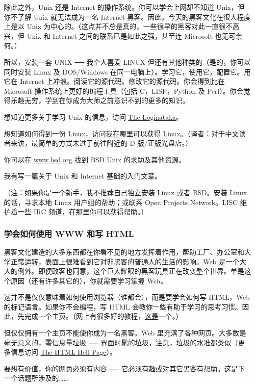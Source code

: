 除此之外，Unix 还是 Internet 的操作系统。你可以学会上网却不知道 Unix，但你不了解 Unix 就无法成为一名 Internet 黑客。因此，今天的黑客文化在很大程度上是以 Unix 为中心的。（这点并不总是真的，一些很早的黑客对此一直很不高兴，但 Unix 和 Internet 之间的联系已是如此之强，甚至连 Microsoft 也无可奈何。）

所以，安装一套 UNIX ── 我个人喜爱 LINUX 但还有其他种类的（是的，你可以同时安装 Linux 及 DOS/Windows 在同一电脑上）。学习它，使用它，配置它。用它在 Internet 上冲浪。阅读它的源代码。修改它的源代码。你会得到比在 Microsoft 操作系统上更好的编程工具（包括 C，LISP，Python 及 Perl）。你会觉得乐趣无穷，学到在你成为大师之前意识不到的更多的知识。

想知道更多关于学习 Unix 的信息，访问 \href{http://www.catb.org/esr/faqs/loginataka.html}{The Loginataka}。

想知道如何得到一份 Linux，访问我在哪里可以获得 Linux。（译者：对于中文读者来讲，最简单的方式未过于前往附近的 D 版/正版光盘店。）

你可以在 \url{www.bsd.org} 找到 BSD Unix 的求助及其他资源。

我有写一篇关于 Unix 和 Internet 基础的入门文章。

（注：如果你是一个新手，我不推荐自己独立安装 Linux 或者 BSD。安装 Linux 的话，寻求本地 Linux 用户组的帮助；或联系 Open Projects Network。LISC 维护着一些 IRC 频道，在那里你可以获得帮助。）


\subsubsection{学会如何使用 WWW 和写 HTML}
黑客文化建造的大多东西都在你看不见的地方发挥着作用，帮助工厂、办公室和大学正常运转，表面上很难看到它对非黑客的普通人的生活的影响。Web 是一个大大的例外。即便政客也同意，这个巨大耀眼的黑客玩具正在改变整个世界。单是这个原因（还有许多其它的），你就需要学习掌握 Web。

这并不是仅仅意味着如何使用浏览器（谁都会），而是要学会如何写 HTML，Web 的标记语言。如果你不会编程，写 HTML 会教你一些有助于学习的思考习惯。因此，先完成一个主页。（网上有很多好的教程，\href{http://htmldog.com/}{这是}一个。）

但仅仅拥有一个主页不能使你成为一名黑客。Web 里充满了各种网页。大多数是毫无意义的，零信息量垃圾 ── 界面时髦的垃圾，注意，垃圾的水准都类似（更多信息访问 \href{http://catb.org/~esr/html-hell.html}{The HTML Hell Page}）。

要想有价值，你的网页必须有内容 ── 它必须有趣或对其它黑客有帮助。这是下一个话题所涉及的……


